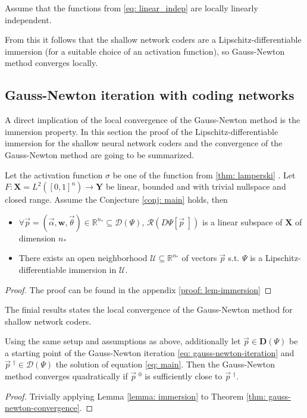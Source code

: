 \begin{conjecture}
    \label{conj: main}
    Assume that the functions from \ref{eq: linear_indep} are locally
    linearly independent.
\end{conjecture}
From this it follows that the shallow network coders are a
Lipschitz-differentiable immersion (for a suitable choice of an activation
function), so Gauss-Newton method converges locally.
\subsection{Gauss-Newton iteration with coding networks}
A direct implication of the local convergence of the Gauss-Newton method is
the immersion property. In this section the proof of the
Lipschitz-differentiable immersion for the shallow neural network coders and
the convergence of the Gauss-Newton method are going to be summarized.
\begin{lemma}
    \label{lemma: immersion}
    Let the activation function $\sigma$ be one of the function from
    \ref{thm: lamperski} \cite{lamperski_2022}. Let $F:\mathbf{X}=L^{2}\left(
    [0, 1]^{n}\right) \to \mathbf{Y}$ be linear, bounded and with trivial
    nullspace and closed range. Assume the Conjecture \ref{conj: main}
    holds, then
    \begin{itemize}
        \item $\forall \vec{p} = (\vec{\alpha}, \mathbf{w}, \vec{\theta}) \in
            \mathbb{R}^{n_*} \subseteq \mathcal{D}(\Psi)$,
            $\mathcal{R}(D\Psi[\vec{p}\;])$ is a linear
            subspace of $\mathbf{X}$ of dimension $n_*$
        \item There exists an open neighborhood $\mathcal{U} \subseteq
            \mathbb{R}^{n_*}$ of vectors $\vec{p}$ s.t. $\Psi$ is a
            Lipschitz-differentiable immersion in $\mathcal{U}$.
    \end{itemize}
\end{lemma}
\begin{proof}
    The proof can be found in the appendix \ref{proof: lem-immersion}
\end{proof}


The finial results states the local convergence of the Gauss-Newton method
for shallow network coders.
\begin{theorem}
    Using the same setup and assumptions as above, additionally let $\vec{p}
    \in \mathbf{D}(\Psi)$ be a starting point of the Gauss-Newton iteration
    \ref{eq: gauss-newton-iteration} and $\vec{p}\;^{\dagger} \in
    \mathcal{D}(\Psi)$ the solution of equation \ref{eq: main}. Then the
    Gauss-Newton method converges quadratically if
    $\vec{p}\;^{0}$ is sufficiently close to $\vec{p}\;^{\dagger}$.
\end{theorem}
\begin{proof}

    Trivially applying Lemma \ref{lemma: immersion} to Theorem
    \ref{thm: gauss-newton-convergence}.
\end{proof}




